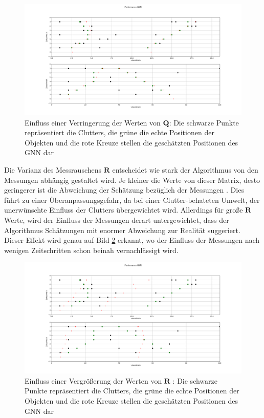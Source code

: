 \documentclass[10pt,a4paper]{article}
\begin{document}
\begin{figure}[h!]
\includegraphics[width=12 cm]{./Pictures_report/GNNQ0}
\caption{Einfluss einer Verringerung der Werten von $\textbf{Q}$: Die schwarze Punkte repräsentiert die Clutters, die grüne die echte Positionen der Objekten und die rote Kreuze stellen die geschätzten Positionen des GNN dar}
\label{pic:GNNQ0}
\end{figure}
Die Varianz des Messrauschens $\textbf{R}$ entscheidet wie stark der Algorithmus von den Messungen abhängig gestaltet wird. Je kleiner die Werte von dieser Matrix, desto geringerer ist die Abweichung der Schätzung bezüglich der Messungen . Dies führt zu einer Überanpassungsgefahr, da bei einer Clutter-behateten Umwelt, der unerwünschte Einfluss der Clutters übergewichtet wird. Allerdings für große $\textbf{R}$ Werte, wird der Einfluss der Messungen derart untergewichtet, dass der Algorithmus Schätzungen mit enormer Abweichung zur Realität suggeriert. Dieser Effekt wird genau auf Bild \ref{pic:GNNR1} erkannt, wo der Einfluss der Messungen nach wenigen Zeitschritten schon beinah vernachlässigt wird.\\
\begin{figure}[h!]
\includegraphics[width=12 cm]{./Pictures_report/GNNR1}
\caption{Einfluss einer Vergrößerung der Werten von $\textbf{R}$ : Die schwarze Punkte repräsentiert die Clutters, die grüne die echte Positionen der Objekten und die rote Kreuze stellen die geschätzten Positionen des GNN dar}
\label{pic:GNNR1}
\end{figure}
\end{document}
